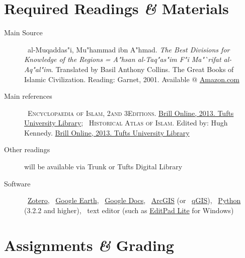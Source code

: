 \documentclass{tufte-handout} %
\def\and{\textit{\&}\xspace}
\begin{document}
\section{Required Readings \and Materials}
\begin{description}

\item[Main Source]\textbullet~{al-Muqaddas"i, Mu"hammad ibn A"hmad. \textit{The Best Divisions for Knowledge of the Regions = A"hsan al-Taq"as"im F"i Ma"`rifat al-Aq"al"im}. Translated by Basil Anthony Collins. The Great Books of Islamic Civilization. Reading: Garnet, 2001. Available @ \href{http://www.amazon.com/Best-Divisions-Knowledge-Regions-Civilization/dp/1859641369/ref=sr_1_1?ie=UTF8&qid=1384627229&sr=8-1&keywords=The+Best+Divisions+for+Knowledge+of+the+Regions}{Amazon.com}}

\item[Main references]

\textbullet~{\textsc{Encyclopaedia of Islam, 2\nd and 3\rd Editions}. \href{http://referenceworks.brillonline.com.ezproxy.library.tufts.edu/entries/encyclopaedia-of-islam-2/djughrafiya-COM_0194}{Brill Online, 2013. Tufts University Library}};
\textbullet~\textsc{Historical Atlas of Islam}. Edited by: Hugh Kennedy. \href{http://referenceworks.brillonline.com/browse/historical-atlas-of-islam}{Brill Online, 2013. Tufts University Library}

\item[Other readings]{will be available via Trunk or Tufts Digital Library}

\item[Software]{
\textbullet~\href{http://www.zotero.org/}{Zotero}, 
\textbullet~\href{http://www.google.com/earth/}{Google Earth},
\textbullet~\href{https://docs.google.com}{Google Docs},
\textbullet~\href{http://www.esri.com/software/arcgis}{ArcGIS} (or 
\textbullet~\href{http://www.qgis.org/en/site/}{qGIS}), 
\textbullet~\href{http://www.python.org/}{Python} (3.2.2 and higher),
\textbullet~text editor (such as \href{http://www.editpadlite.com/}{EditPad Lite} for Windows)
}

\end{description}




\section{Assignments \and Grading}

\end{document}
